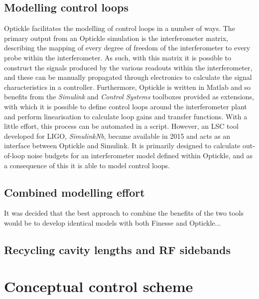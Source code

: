 \subsection{Modelling control loops}
Optickle facilitates the modelling of control loops in a number of ways. The primary output from an Optickle simulation is the interferometer matrix, describing the mapping of every degree of freedom of the interferometer to every probe within the interferometer. As such, with this matrix it is possible to construct the signals produced by the various readouts within the interferometer, and these can be manually propagated through electronics to calculate the signal characteristics in a controller. Furthermore, Optickle is written in Matlab and so benefits from the \emph{Simulink} and \emph{Control Systems} toolboxes provided as extensions, with which it is possible to define control loops around the interferometer plant and perform linearisation to calculate loop gains and transfer functions. With a little effort, this process can be automated in a script. However, an \gls{LSC} tool developed for \gls{LIGO}, \emph{SimulinkNb}, became available in 2015 and acts as an interface between Optickle and Simulink. It is primarily designed to calculate out-of-loop noise budgets for an interferometer model defined within Optickle, and as a consequence of this it is able to model control loops.

\subsection{Combined modelling effort}
It was decided that the best approach to combine the benefits of the two tools would be to develop identical models with both Finesse and Optickle...

\subsection{Recycling cavity lengths and RF sidebands}


\section{Conceptual control scheme}


